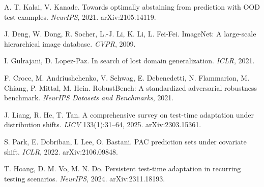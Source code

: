 
 A. T. Kalai, V. Kanade. Towards optimally abstaining from
prediction with OOD test examples. \emph{NeurIPS}, 2021. arXiv:2105.14119.

 J. Deng, W. Dong, R. Socher, L.-J. Li, K. Li, L. Fei-Fei.
ImageNet: A large-scale hierarchical image database. \emph{CVPR}, 2009.

 I. Gulrajani, D. Lopez-Paz. In search of lost
domain generalization. \emph{ICLR}, 2021.

 F. Croce, M. Andriushchenko, V. Sehwag,
E. Debenedetti, N. Flammarion, M. Chiang, P. Mittal, M. Hein.
RobustBench: A standardized adversarial robustness benchmark.
\emph{NeurIPS Datasets and Benchmarks}, 2021.

 J. Liang, R. He, T. Tan. A comprehensive survey on
test-time adaptation under distribution shifts. \emph{IJCV} 133(1):31--64, 2025.
arXiv:2303.15361.

 S. Park, E. Dobriban, I. Lee, O. Bastani. PAC prediction sets
under covariate shift. \emph{ICLR}, 2022. arXiv:2106.09848.

 T. Hoang, D. M. Vo, M. N. Do. Persistent test-time adaptation
in recurring testing scenarios. \emph{NeurIPS}, 2024. arXiv:2311.18193.

